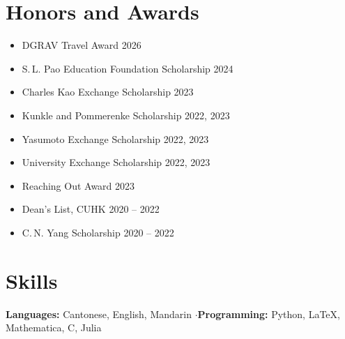 \documentclass[11pt]{article}
\begin{document}
\section*{Honors and Awards}
\begin{itemize}
  \item DGRAV Travel Award \hfill 2026
  \item S.\,L. Pao Education Foundation Scholarship \hfill 2024
  \item Charles Kao Exchange Scholarship \hfill 2023
  \item Kunkle and Pommerenke Scholarship \hfill 2022, 2023
  \item Yasumoto Exchange Scholarship \hfill 2022, 2023
  \item University Exchange Scholarship \hfill 2022, 2023
  \item Reaching Out Award \hfill 2023
  \item Dean's List, CUHK \hfill 2020 -- 2022
  \item C.\,N. Yang Scholarship \hfill 2020 -- 2022
\end{itemize}

\section*{Skills}
\textbf{Languages:} Cantonese, English, Mandarin \quad$\cdot$\quad \textbf{Programming:} Python, \LaTeX, Mathematica, C, Julia
\end{document}
